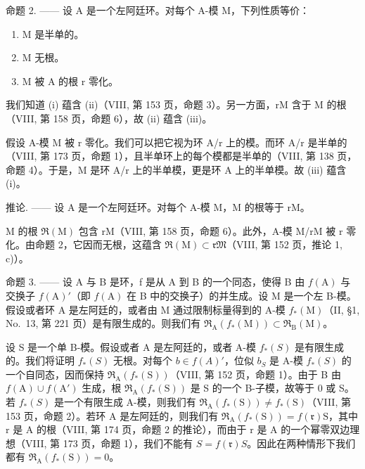 命题 2. —— 设 A 是一个左阿廷环。对每个 A-模 M，下列性质等价：

\begin{enumerate}
\def\labelenumi{(\roman{enumi})}
\item
  M 是半单的。
\item
  M 无根。
\item
  M 被 A 的根 r 零化。
\end{enumerate}

我们知道 (i) 蕴含 (ii)（VIII, 第 153 页，命题 3）。另一方面，rM 含于 M 的根（VIII, 第 158 页，命题 6），故 (ii) 蕴含 (iii)。

假设 A-模 M 被 r 零化。我们可以把它视为环 A/r 上的模。而环 A/r 是半单的（VIII, 第 173 页，命题 1），且半单环上的每个模都是半单的（VIII, 第 138 页，命题 4）。于是，M 是环 A/r 上的半单模，更是环 A 上的半单模。故 (iii) 蕴含 (i)。

推论. —— 设 A 是一个左阿廷环。对每个 A-模 M，M 的根等于 rM。

M 的根 \(\Re(\mathrm{M})\) 包含 rM（VIII, 第 158 页，命题 6）。此外，A-模 M/rM 被 r 零化。由命题 2，它因而无根，这蕴含 \(\Re(\mathrm{M}) \subset \mathfrak{rM}\)（VIII, 第 152 页，推论 1, c)）。

命题 3. —— 设 A 与 B 是环，f 是从 A 到 B 的一个同态，使得 B 由 \(f(\mathrm{A})\) 与交换子 \(f(\mathrm{A})'\)（即 \(f(\mathrm{A})\) 在 B 中的交换子）的并生成。设 M 是一个左 B-模。假设或者环 A 是左阿廷的，或者由 M 通过限制标量得到的 A-模 \(f_{*}(\mathrm{M})\)（II, §1, No.~13, 第 221 页）是有限生成的。则我们有 \(\mathfrak{R}_{\mathrm{A}}(f_{*}(\mathrm{M})) \subset \mathfrak{R}_{\mathrm{B}}(\mathrm{M})\)。

设 S 是一个单 B-模。假设或者 A 是左阿廷的，或者 A-模 \(f_{*}(S)\) 是有限生成的。我们将证明 \(f_{*}(S)\) 无根。对每个 \(b \in f(A)'\)，位似 \(b_{S}\) 是 A-模 \(f_{*}(S)\) 的一个自同态，因而保持 \(\mathfrak{R}_{\mathrm{A}}(f_{*}(\mathrm{S}))\)（VIII, 第 152 页，命题 1）。由于 B 由 \(f(\mathrm{A}) \cup f(\mathrm{A}')\) 生成，根 \(\mathfrak{R}_{\mathrm{A}}(f_{*}(\mathrm{S}))\) 是 S 的一个 B-子模，故等于 0 或 S。若 \(f_{*}(S)\) 是一个有限生成 A-模，则我们有 \(\mathfrak{R}_{\mathrm{A}}(f_{*}(\mathrm{S})) \neq f_{*}(\mathrm{S})\)（VIII, 第 153 页，命题 2）。若环 A 是左阿廷的，则我们有 \(\mathfrak{R}_{\mathrm{A}}(f_{*}(\mathrm{S})) = f(\mathfrak{r})\mathrm{S}\)，其中 r 是 A 的根（VIII, 第 174 页，命题 2 的推论），而由于 r 是 A 的一个幂零双边理想（VIII, 第 173 页，命题 1），我们不能有 \(S = f(\mathfrak{r})S\)。因此在两种情形下我们都有 \(\mathfrak{R}_{\mathrm{A}}(f_{*}(\mathrm{S})) = 0\)。

